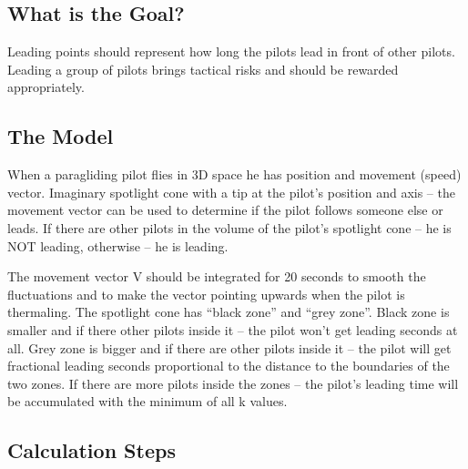 \documentclass[gap.tex]{subfiles}
\begin{document}
\label{sec:real-leading}

\subsection{What is the Goal?}
Leading points should represent how long the pilots lead in front of other
pilots. Leading a group of pilots brings tactical risks and should be rewarded
appropriately.

\subsection{The Model}
When a paragliding pilot flies in 3D space he has
position and movement (speed) vector. Imaginary spotlight cone with a tip at
the pilot’s position and axis – the movement vector can be used to determine if
the pilot follows someone else or leads. If there are other pilots in the
volume of the pilot’s spotlight cone – he is NOT leading, otherwise – he is
leading.

The movement vector V should be integrated for 20 seconds to smooth
the fluctuations and to make the vector pointing upwards when the pilot is
thermaling. The spotlight cone has “black zone” and “grey zone”. Black zone is
smaller and if there other pilots inside it – the pilot won’t get leading
seconds at all. Grey zone is bigger and if there are other pilots inside it
– the pilot will get fractional leading seconds proportional to the distance to
the boundaries of the two zones. If there are more pilots inside the zones
– the pilot’s leading time will be accumulated with the minimum of all
k values.

\subsection{Calculation Steps}
\end{document}
